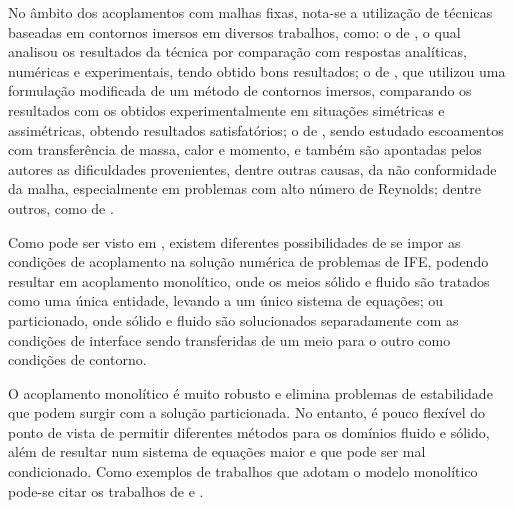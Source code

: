No âmbito dos acoplamentos com malhas fixas, nota-se a utilização de técnicas baseadas em contornos imersos em diversos trabalhos, como: o de , o qual analisou os resultados da técnica por comparação com respostas analíticas, numéricas e experimentais, tendo obtido bons resultados; o de , que utilizou uma formulação modificada de um método de contornos imersos, comparando os resultados com os obtidos experimentalmente em situações simétricas e assimétricas, obtendo resultados satisfatórios; o de , sendo estudado escoamentos com transferência de massa, calor e momento, e também são apontadas pelos autores as dificuldades provenientes, dentre outras causas, da não conformidade da malha, especialmente em problemas com alto número de Reynolds; dentre outros, como de .

Como pode ser visto em , existem diferentes possibilidades de se impor as condições de acoplamento na solução numérica de problemas de IFE, podendo resultar em acoplamento monolítico, onde os meios sólido e fluido são tratados como uma única entidade, levando a um único sistema de equações; ou particionado, onde sólido e fluido são solucionados separadamente com as condições de interface sendo transferidas de um meio para o outro como condições de contorno.

O acoplamento monolítico é muito robusto e elimina problemas de estabilidade que podem surgir com a solução particionada. No entanto, é pouco flexível do ponto de vista de permitir diferentes métodos para os domínios fluido e sólido, além de resultar num sistema de equações maior e que pode ser mal condicionado. Como exemplos de trabalhos que adotam o modelo monolítico pode-se citar os trabalhos de  e .

